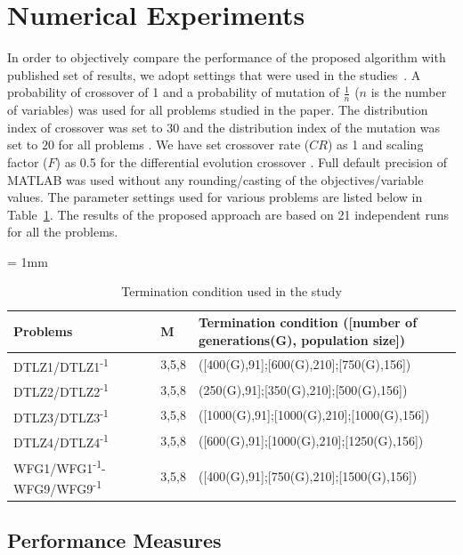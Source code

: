 \documentclass{sig-alternate}
\begin{document}
\section{Numerical Experiments}
\label{sec:expset}

In order to objectively compare the performance of the proposed algorithm with published set of results, we adopt settings that were used in the studies~\cite{Deb2014adaptive,ishibuchi2016inverse}. A probability of crossover of 1 and a probability of mutation of $\frac{1}{n}$ ($n$ is the number of variables) \cite{Deb2014adaptive} was used for all problems studied in the paper. The distribution index of crossover was set to $30$ and the distribution index of the mutation was set to $20$ for all problems \cite{Deb2014adaptive}. We have set crossover rate ($CR$) as 1 and scaling factor ($F$) as 0.5 for the differential evolution crossover \cite{das2011de}. Full default precision of MATLAB was used without any rounding/casting of the objectives/variable values. The parameter settings used for various problems are listed below in Table~\ref{tab:params_term_con}. The results of the proposed approach are based on 21 independent runs for all the problems.  

\begin{table}[!htb]
\begin{threeparttable}
\caption{Termination condition used in the study}
\label{tab:params_term_con}
\tabcolsep = 1mm
\begin{tabular}{p{2.5cm}p{.5cm}p{5cm}}
\hline
\textbf{Problems}&\textbf{M}& \textbf{Termination condition ([number of generations(G), population size])}\\
\hline
DTLZ1/DTLZ1\textsuperscript{-1}& 3,5,8 &([400(G),91];[600(G),210];[750(G),156])\\
DTLZ2/DTLZ2\textsuperscript{-1}& 3,5,8 &(250(G),91];[350(G),210];[500(G),156])\\
DTLZ3/DTLZ3\textsuperscript{-1}& 3,5,8 &([1000(G),91];[1000(G),210];[1000(G),156])\\
DTLZ4/DTLZ4\textsuperscript{-1}& 3,5,8 &([600(G),91];[1000(G),210];[1250(G),156])\\
WFG1/WFG1\textsuperscript{-1}-WFG9/WFG9\textsuperscript{-1}& 3,5,8 &([400(G),91];[750(G),210];[1500(G),156])\\
\hline
\end{tabular}
\end{threeparttable}
\end{table}

\subsection{Performance Measures}
\label{sec:perf}
\end{document}

